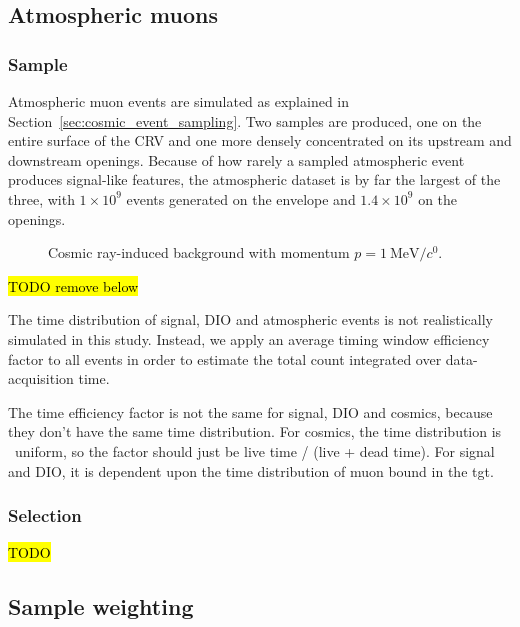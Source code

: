 \subsection{Atmospheric muons}

\subsubsection{Sample}

Atmospheric muon events are simulated as explained in
Section~\ref{sec:cosmic_event_sampling}. Two samples are produced, one on the
entire surface of the CRV and one more densely concentrated on its upstream and
downstream openings. Because of how rarely a sampled atmospheric event produces
signal-like features, the atmospheric dataset is by far the largest of the
three, with $1 \times 10^9$ events generated on the envelope and $1.4 \times
10^9$ on the openings.



\begin{figure}
    \centering
    
    \caption{Cosmic ray-induced background with momentum $p=\SI{1}{\MeV/\clight}$.}
    \label{fig:cosmic_bg_in_cydet}
\end{figure}


\hl{TODO remove below}

The time distribution of signal, DIO and atmospheric events is not realistically
simulated in this study. Instead, we apply an average timing window efficiency
factor to all events in order to estimate the total count integrated over
data-acquisition time.

The time efficiency factor is not the same for signal, DIO and cosmics,
because they don't have the same time distribution. For cosmics, the time
distribution is ~uniform, so the factor should just be live time / (live +
dead time). For signal and DIO, it is dependent upon the time distribution of
muon bound in the tgt.

\subsubsection{Selection}
\hl{TODO}


\subsection{Sample weighting}

